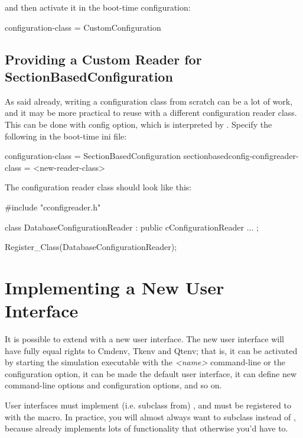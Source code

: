 and then activate it in the boot-time configuration:

\begin{inifile}
[General]
configuration-class = CustomConfiguration
\end{inifile}


\subsection{Providing a Custom Reader for SectionBasedConfiguration}
\label{sec:plugin-exts:custom-reader-for-sectionbasedconfiguration}

As said already, writing a configuration class from scratch can
be a lot of work, and it may be more practical to reuse
 with a different configuration
reader class. This can be done with 
config option, which is interpreted by .
Specify the following in the boot-time ini file:

\begin{inifile}
[General]
configuration-class = SectionBasedConfiguration
sectionbasedconfig-configreader-class = <new-reader-class>
\end{inifile}

The configuration reader class should look like this:

\begin{cpp}
#include "cconfigreader.h"

class DatabaseConfigurationReader : public cConfigurationReader
{
   ...
};

Register_Class(DatabaseConfigurationReader);
\end{cpp}


\section{Implementing a New User Interface}
\label{sec:plugin-exts:user-interface}

It is possible to extend {\opp} with a new user interface. The new
user interface will have fully equal rights to Cmdenv, Tkenv and Qtenv;
that is, it can be activated by starting the simulation executable with the
 \textit{<name>} command-line or the 
configuration option, it can be made the default user interface,
it can define new command-line options and configuration options,
and so on.

User interfaces must implement (i.e. subclass from) ,
and must be registered to {\opp} with the  macro.
In practice, you will almost always want to subclass 
instead of , because  already
implements lots of functionality that otherwise you'd have to.

